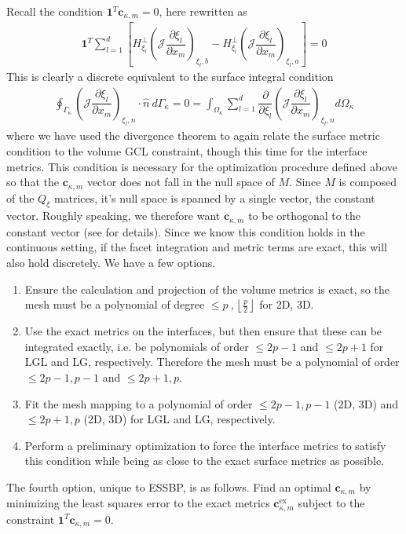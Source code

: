 \documentclass[12pt,a4paper]{article}
\newcommand{\pder}[2][]{\dfrac{\partial #1}{\partial #2}} %
\newcommand{\fn}[1]{\mathcal{#1}} %
\begin{document}
Recall the condition $\bm{1}^T \bm{c}_{\kappa,m} = 0$, here rewritten as
\begin{align*}
 \bm{1}^T \sum_{l = 1}^d \left[ H^{\bot}_{\xi_l}  \left( \fn{J} \pder[\xi_l]{x_m} \right)_{\xi_l,b} - H^{\bot}_{\xi_l}  \left( \fn{J} \pder[\xi_l]{x_m} \right)_{\xi_l,a} \right] = 0
\end{align*}
This is clearly a discrete equivalent to the surface integral condition
\begin{align*}
\oint_{\Gamma_\kappa}  \left( \fn{J} \pder[\xi_l]{x_m} \right)_{\xi_l,n} \cdot \hat{n} \ d {\Gamma_\kappa} = 0 =  \int_{\Omega_\kappa}  \sum_{l = 1}^d \pder{\xi_l}  \left( \fn{J} \pder[\xi_l]{x_m} \right)_{\xi_l,n} d \Omega_\kappa
\end{align*}
where we have used the divergence theorem to again relate the surface metric condition to the volume GCL constraint, though this time for the interface metrics. This condition is necessary for the optimization procedure defined above so that the $\bm{c}_{\kappa,m}$ vector does not fall in the null space of $M$. Since $M$ is composed of the $Q_\xi$ matrices, it's null space is spanned by a single vector, the constant vector. Roughly speaking, we therefore want $\bm{c}_{\kappa,m}$ to be orthogonal to the constant vector (see \cite{del_rey_fernandez_entropy_2019} for details). Since we know this condition holds in the continuous setting, if the facet integration and metric terms are exact, this will also hold discretely. We have a few options. 
\begin{enumerate}
\item  Ensure the calculation and projection of the volume metrics is exact, so the mesh must be a polynomial of degree $ \leq p \ , \left\lfloor \frac{p}{2} \right\rfloor$ for 2D, 3D.
\item Use the exact metrics on the interfaces, but then ensure that these can be integrated exactly, i.e. be polynomials of order $\leq 2p-1$ and $\leq 2p+1$ for LGL and LG, respectively. Therefore the mesh must be a polynomial of order $\leq 2p-1 , p-1 $ and $\leq 2p+1 , p$.
\item Fit the mesh mapping to a polynomial of order $\leq 2p-1 , p-1 $ (2D, 3D) and $\leq 2p+1 , p$ (2D, 3D) for LGL and LG, respectively.
\item Perform a preliminary optimization to force the interface metrics to satisfy this condition while being as close to the exact surface metrics as possible.
\end{enumerate}
The fourth option, unique to ESSBP, is as follows. Find an optimal $\bm{c}_{\kappa , m}$ by minimizing the least squares error to the exact metrics $\bm{c}_{\kappa , m}^\text{ex}$  subject to the constraint $\bm{1}^T \bm{c}_{\kappa , m} = 0$. \\
\end{document}
